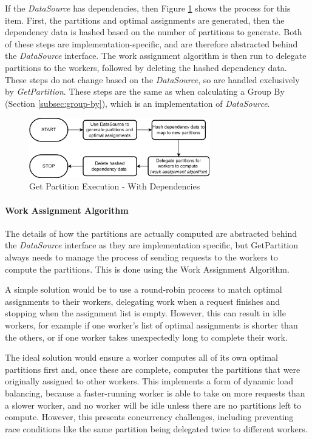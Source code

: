 If the \textit{DataSource} has dependencies, then Figure \ref{fig:get-partition-dependencies} shows the process for this item. First, the partitions and optimal assignments are generated, then the dependency data is hashed based on the number of partitions to generate. Both of these steps are implementation-specific, and are therefore abstracted behind the \textit{DataSource} interface. The work assignment algorithm is then run to delegate partitions to the workers, followed by deleting the hashed dependency data. These steps do not change based on the \textit{DataSource}, so are handled exclusively by \textit{GetPartition}. These steps are the same as when calculating a Group By (Section \ref{subsec:group-by}), which is an implementation of \textit{DataSource}.

\begin{figure}[h]
	\centering
	\includegraphics[width=0.7\textwidth]{chapters/diagrams/implementation/get-partition-dependencies-flow}
	\caption{Get Partition Execution - With Dependencies}
	\label{fig:get-partition-dependencies}
\end{figure}

\paragraph{Work Assignment Algorithm}
The details of how the partitions are actually computed are abstracted behind the \textit{DataSource} interface as they are implementation specific, but GetPartition always needs to manage the process of sending requests to the workers to compute the partitions. This is done using the Work Assignment Algorithm. 

A simple solution would be to use a round-robin process to match optimal assignments to their workers, delegating work when a request finishes and stopping when the assignment list is empty. However, this can result in idle workers, for example if one worker's list of optimal assignments is shorter than the others, or if one worker takes unexpectedly long to complete their work.

The ideal solution would ensure a worker computes all of its own optimal partitions first and, once these are complete, computes the partitions that were originally assigned to other workers. This implements a form of dynamic load balancing, because a faster-running worker is able to take on more requests than a slower worker, and no worker will be idle unless there are no partitions left to compute. However, this presents concurrency challenges, including preventing race conditions like the same partition being delegated twice to different workers.

